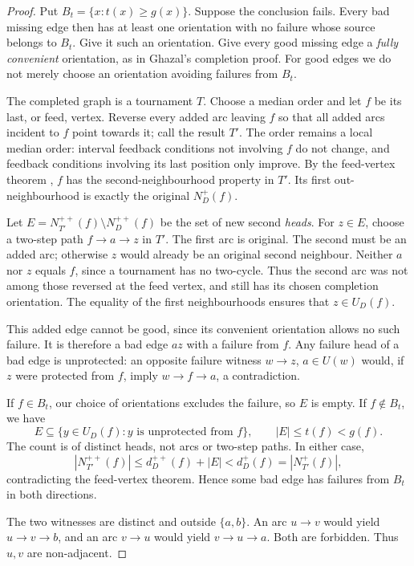 \begin{proof}
Put $B_t=\{x:t(x)\ge g(x)\}$. Suppose the conclusion fails. Every bad
missing edge then has at least one orientation with no failure whose
source belongs to $B_t$. Give it such an orientation. Give every good
missing edge a \emph{fully convenient} orientation, as in Ghazal's
completion proof. For good edges we do not merely choose an orientation
avoiding failures from $B_t$.

The completed graph is a tournament $T$. Choose a median order and let
$f$ be its last, or feed, vertex. Reverse every added arc leaving $f$
so that all added arcs incident to $f$ point towards it; call the
result $T'$. The order remains a local median order: interval feedback
conditions not involving $f$ do not change, and feedback conditions
involving its last position only improve. By the feed-vertex theorem
\cite{HavetThomasse2000},
$f$ has the second-neighbourhood property in $T'$. Its first
out-neighbourhood is exactly the original $N_D^+(f)$.

Let $E=N_{T'}^{++}(f)\setminus N_D^{++}(f)$ be the set of new second
\emph{heads}. For $z\in E$, choose a two-step path $f\to a\to z$
in $T'$. The first arc is original. The second must be an added arc;
otherwise $z$ would already be an original second neighbour. Neither
$a$ nor $z$ equals $f$, since a tournament has no two-cycle. Thus the
second arc was not among those reversed at the feed vertex, and still
has its chosen completion orientation. The equality of the first
neighbourhoods ensures that $z\in U_D(f)$.

This added edge cannot be good, since its convenient orientation
allows no such failure. It is therefore a bad edge $az$ with a failure
from $f$. Any failure head of a bad edge is unprotected: an opposite
failure witness $w\to z$, $a\in U(w)$ would, if $z$ were protected
from $f$, imply $w\to f\to a$, a contradiction.

If $f\in B_t$, our choice of orientations excludes the failure, so
$E$ is empty. If $f\notin B_t$, we have
\[
 E\subseteq\{y\in U_D(f):y\text{ is unprotected from }f\},
 \qquad |E|\le t(f)<g(f).
\]
The count is of distinct heads, not arcs or two-step paths.
In either case,
\[
 |N_{T'}^{++}(f)|\le d_D^{++}(f)+|E|<d_D^+(f)
                         =|N_{T'}^+(f)|,
\]
contradicting the feed-vertex theorem. Hence some bad edge has failures
from $B_t$ in both directions.

The two witnesses are distinct and outside $\{a,b\}$. An arc $u\to v$
would yield $u\to v\to b$, and an arc $v\to u$ would yield
$v\to u\to a$. Both are forbidden. Thus $u,v$ are non-adjacent.
\end{proof}

